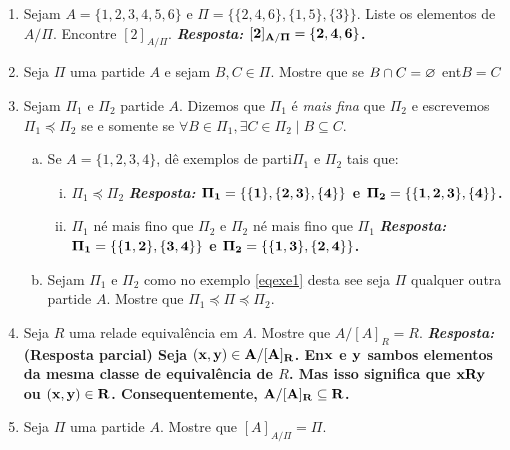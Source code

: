 \begin{enumerate}[{\bf 1.}]

\item Sejam $A=\{1,2,3,4,5,6\}$ e $\Pi=\{\{2,4,6\},\{1,5\},\{3\}\}$. Liste os elementos de $A/\Pi$. Encontre $[2]_{A/\Pi}$. 
{\bf{\it Resposta:} ${\bf [2]_{A/\Pi}=\{2,4,6\}}$.}

\item Seja $\Pi$ uma parti\cao de $A$ e sejam $B,C\in\Pi$. Mostre que se $B\cap C=\varnothing$ ent\ao $B=C$

\item\label{eqrexcerc3} Sejam $\Pi_1$ e $\Pi_2$ parti\coes de $A$. Dizemos que $\Pi_1$ \'e {\it mais fina} que $\Pi_2$ e escrevemos $\Pi_1\preceq\Pi_2$ se e somente se $\forall B\in \Pi_1, \exists C\in \Pi_2 \mid  B\subseteq C$.
\begin{enumerate}[a)]
\item Se $A=\{1,2,3,4\}$, d\^e exemplos de parti\coes $\Pi_1$ e $\Pi_2$ tais que:
\begin{enumerate}[i.]
\item $\Pi_1\preceq\Pi_2$ {\bf{\it Resposta:} ${\bf \Pi_1=\{\{1\},\{2,3\},\{4\}\}}$ e ${\bf \Pi_2=\{\{1,2,3\},\{4\}\}}$.}
\item $\Pi_1$ n\ao \'e mais fino que $\Pi_2$ e $\Pi_2$ n\ao \'e mais fino que $\Pi_1$ {\bf{\it Resposta:} ${\bf \Pi_1=\{\{1,2\},\{3,4\}\}}$ e ${\bf \Pi_2=\{\{1,3\},\{2,4\}\}}$.}
\end{enumerate}
\item Sejam $\Pi_1$ e $\Pi_2$ como no exemplo \ref{eqexe1} desta se\cao e seja $\Pi$ qualquer outra parti\cao de $A$. Mostre que $\Pi_1\preceq\Pi\preceq\Pi_2$.
\end{enumerate}

\item Seja $R$ uma rela\cao de equival\^encia em $A$. Mostre que $A/[A]_R=R$. {\bf{\it Resposta:} (Resposta parcial) Seja ${\bf (x,y)\in A/[A]_R }$. En\tao ${\bf x}$ e ${\bf y}$ s\ao ambos elementos da mesma classe de equival\^encia de $R$. Mas isso significa que ${\bf xRy}$ ou ${\bf (x,y)\in R}$. Consequentemente, ${\bf A/[A]_R\subseteq R}$.}

\item Seja $\Pi$ uma parti\cao de $A$. Mostre que $[A]_{A/\Pi}=\Pi$.


\end{enumerate}
